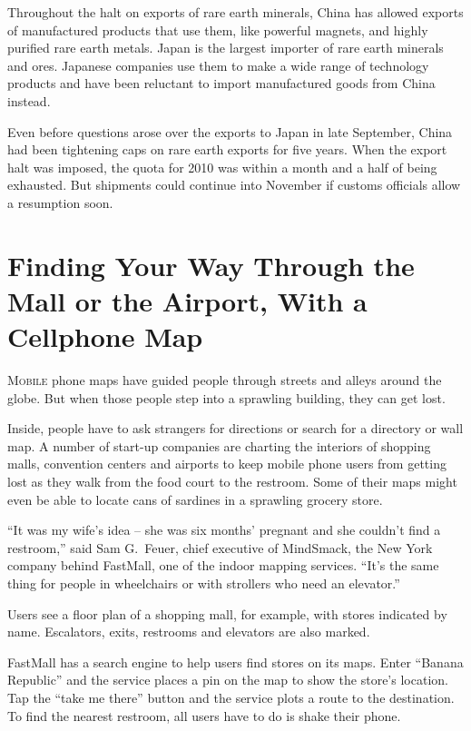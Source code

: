 ﻿\documentclass[12pt]{article}
\begin{document}
Throughout the halt on exports of rare earth minerals, China has allowed exports of manufactured
products that use them, like powerful magnets, and highly purified rare earth metals. Japan is the
largest importer of rare earth minerals and ores. Japanese companies use them to make a wide range
of technology products and have been reluctant to import manufactured goods from China instead.

Even before questions arose over the exports to Japan in late September, China had been tightening
caps on rare earth exports for five years. When the export halt was imposed, the quota for 2010 was
within a month and a half of being exhausted. But shipments could continue into November if customs
officials allow a resumption soon.

\section{Finding Your Way Through the Mall or the Airport, With a Cellphone Map}

\lettrine{M}{obile} phone maps have guided people through streets and alleys
around the globe. But when those people step into a sprawling building, they can get lost.

Inside, people have to ask strangers for directions or search for a directory or wall map. A number
of start-up companies are charting the interiors of shopping malls, convention centers and airports
to keep mobile phone users from getting lost as they walk from the food court to the restroom. Some
of their maps might even be able to locate cans of sardines in a sprawling grocery store.

``It was my wife's idea -- she was six months' pregnant and she couldn't find a restroom,'' said Sam
G.~Feuer, chief executive of MindSmack, the New York company behind FastMall, one of the indoor
mapping services. ``It's the same thing for people in wheelchairs or with strollers who need an
elevator.''

Users see a floor plan of a shopping mall, for example, with stores indicated by name. Escalators,
exits, restrooms and elevators are also marked.

FastMall has a search engine to help users find stores on its maps. Enter ``Banana Republic'' and
the service places a pin on the map to show the store's location. Tap the ``take me there'' button
and the service plots a route to the destination. To find the nearest restroom, all users have to do
is shake their phone.
\end{document}
